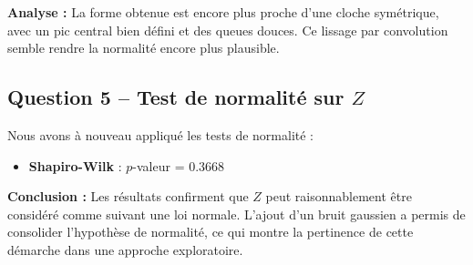 \documentclass[a4paper,11pt]{article}
\begin{document}
\textbf{Analyse :} La forme obtenue est encore plus proche d’une cloche symétrique, avec un pic central bien défini et des queues douces. Ce lissage par convolution semble rendre la normalité encore plus plausible.

\subsection*{Question 5 – Test de normalité sur $Z$}
Nous avons à nouveau appliqué les tests de normalité :

\begin{itemize}
    \item \textbf{Shapiro-Wilk} : $p$-valeur = 0.3668
\end{itemize}

\textbf{Conclusion :} Les résultats confirment que $Z$ peut raisonnablement être considéré comme suivant une loi normale. L’ajout d’un bruit gaussien a permis de consolider l’hypothèse de normalité, ce qui montre la pertinence de cette démarche dans une approche exploratoire.
\end{document}
